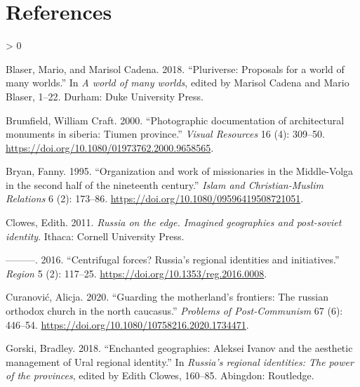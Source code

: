 \documentclass[
  english,
  a4paper,
  DIV=12,
  footlines=2.1,
  usegeometry=true]{scrartcl}
\newlength{\cslhangindent}
\newenvironment{CSLReferences}[2] %
 {%
  \setlength{\parindent}{0pt}
  \ifodd #1 \everypar{\setlength{\hangindent}{\cslhangindent}}\ignorespaces\fi
  \ifnum #2 > 0
  \setlength{\parskip}{#2\baselineskip}
  \fi
 }%
 {}
\begin{document}
\hypertarget{bibliography}{%
\section*{References}\label{bibliography}}

\hypertarget{refs}{}
\begin{CSLReferences}{1}{0}
\leavevmode{}%
Blaser, Mario, and Marisol Cadena. 2018. {``Pluriverse: Proposals for a
world of many worlds.''} In \emph{A world of many worlds}, edited by
Marisol Cadena and Mario Blaser, 1--22. Durham: Duke University Press.

\leavevmode{}%
Brumfield, William Craft. 2000. {``Photographic documentation of
architectural monuments in siberia: Tiumen province.''} \emph{Visual
Resources} 16 (4): 309--50.
\url{https://doi.org/10.1080/01973762.2000.9658565}.

\leavevmode{}%
Bryan, Fanny. 1995. {``Organization and work of missionaries in the
Middle-Volga in the second half of the nineteenth century.''}
\emph{Islam and Christian-Muslim Relations} 6 (2): 173--86.
\url{https://doi.org/10.1080/09596419508721051}.

\leavevmode{}%
Clowes, Edith. 2011. \emph{Russia on the edge. Imagined geographies and
post-soviet identity}. Ithaca: Cornell University Press.

\leavevmode{}%
---------. 2016. {``Centrifugal forces? Russia's regional identities and
initiatives.''} \emph{Region} 5 (2): 117--25.
\url{https://doi.org/10.1353/reg.2016.0008}.

\leavevmode{}%
Curanović, Alicja. 2020. {``Guarding the motherland's frontiers: The
russian orthodox church in the north caucasus.''} \emph{Problems of
Post-Communism} 67 (6): 446--54.
\url{https://doi.org/10.1080/10758216.2020.1734471}.

\leavevmode{}%
Gorski, Bradley. 2018. {``Enchanted geographies: Aleksei Ivanov and the
aesthetic management of Ural regional identity.''} In \emph{Russia's
regional identities: The power of the provinces}, edited by Edith
Clowes, 160--85. Abingdon: Routledge.


\end{CSLReferences}
\end{document}
